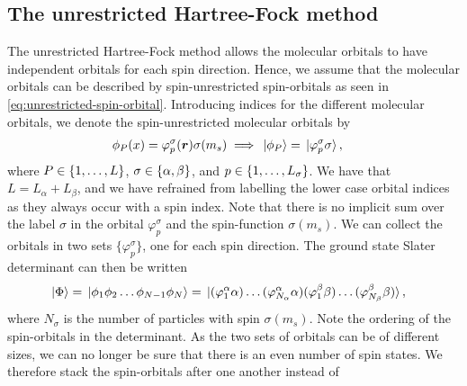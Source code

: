         \subsection{The unrestricted Hartree-Fock method}
            The unrestricted Hartree-Fock method allows the molecular orbitals
            to have independent orbitals for each spin direction.
            Hence, we assume that the molecular orbitals can be described by
            spin-unrestricted spin-orbitals as seen in
            \autoref{eq:unrestricted-spin-orbital}.
            Introducing indices for the different molecular orbitals, we denote
            the spin-unrestricted molecular orbitals by
            \begin{align}
                \phi_P(x)
                &=
                \varphi^{\sigma}_{p}(\boldsymbol{r})
                \sigma(m_s)
                \implies
                \ket*{\phi_P}
                = \ket*{\varphi^{\sigma}_{p}\sigma},
            \end{align}
            where $P \in \left\{ 1, \dots, L \right\}$, $\sigma \in \left\{ \alpha, \beta \right\}$,
            and $p \in \left\{ 1, \dots, L_{\sigma} \right\}$.
            We have that $L = L_{\alpha} + L_{\beta}$, and we have refrained
            from labelling the lower case orbital indices as they always occur
            with a spin index.
            Note that there is no implicit sum over the label $\sigma$ in the
            orbital $\varphi^{\sigma}_{p}$ and the spin-function $\sigma(m_s)$.
            We can collect the orbitals in two sets
            $\bigl\{\varphi^{\sigma}_{p}\bigr\}$, one for each spin direction.
            The ground state Slater determinant can then be written
            \begin{align}
                \ket*{\Phi}
                &=
                \ket*{\phi_1 \phi_2 \dots \phi_{N - 1} \phi_N}
                =
                \ket*{
                    (\varphi^{\alpha}_{1}\alpha)
                    \dots
                    (\varphi^{\alpha}_{N_{\alpha}}\alpha)
                    (\varphi^{\beta}_{1}\beta)
                    \dots
                    (\varphi^{\beta}_{N_{\beta}}\beta)
                },
            \end{align}
            where $N_{\sigma}$ is the number of particles with spin
            $\sigma(m_s)$.
            Note the ordering of the spin-orbitals in the determinant.
            As the two sets of orbitals can be of different sizes, we can no
            longer be sure that there is an even number of spin states.
            We therefore stack the spin-orbitals after one another instead of
